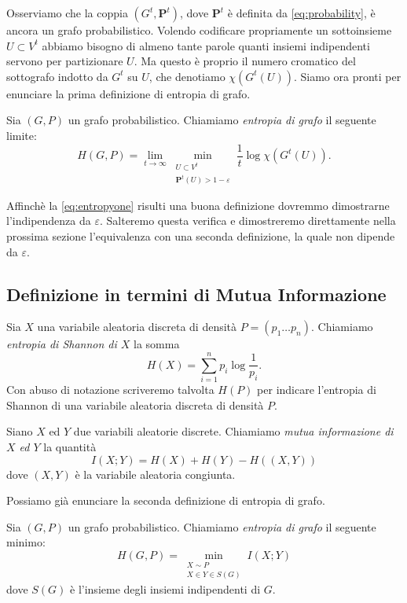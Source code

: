Osserviamo che la coppia \((G^t, \mathbf{P}^t)\), dove \(\mathbf{P}^t\) è definita da \eqref{eq:probability}, è ancora un grafo probabilistico. Volendo codificare propriamente un sottoinsieme \(U\subset V^{t}\) abbiamo bisogno di almeno tante parole quanti insiemi indipendenti servono per partizionare \(U\). Ma questo è proprio il numero cromatico del sottografo indotto da \(G^t\) su \(U\), che denotiamo \(\chi(G^t(U))\). Siamo ora pronti per enunciare la prima definizione di entropia di grafo. 
\begin{definition}
  Sia \((G,P)\) un grafo probabilistico. Chiamiamo \emph{entropia di grafo} il seguente limite: 
  \begin{equation}
    \label{eq:entropyone} H(G,P)=\lim_{t\to \infty} \min_{\substack{ U\subset V^t\\\mathbf{P}^t(U)>1-\varepsilon}} \frac{1}{t}\log{\chi(G^t(U))}. 
  \end{equation}
\end{definition}

Affinchè la \ref{eq:entropyone} risulti una buona definizione dovremmo dimostrarne l'indipendenza da \(\varepsilon\). Salteremo questa verifica e dimostreremo direttamente nella prossima sezione l'equivalenza con una seconda definizione, la quale non dipende da \(\varepsilon\).

\subsection{Definizione in termini di Mutua Informazione} 
\begin{definition}
  Sia \(X\) una variabile aleatoria discreta di densità \(P=(p_1\dots p_n)\). Chiamiamo \emph{entropia di Shannon di \(X\)} la somma
  \[H(X)=\sum_{i=1}^n p_i \log{\frac{1}{p_i}}.\]
  Con abuso di notazione scriveremo talvolta \(H(P)\) per indicare l'entropia di Shannon di una variabile aleatoria discreta di densit\`a \(P\). 
\end{definition}
\begin{definition}
  Siano \(X\) ed \(Y\) due variabili aleatorie discrete. Chiamiamo \emph{mutua informazione di \(X\) ed \(Y\)} la quantità
  \[I(X;Y)=H(X)+H(Y)-H((X,Y))\]
  dove \((X,Y)\) è la variabile aleatoria congiunta. 
\end{definition}

Possiamo già enunciare la seconda definizione di entropia di grafo. 
\begin{definition}
  Sia \((G,P)\) un grafo probabilistico. Chiamiamo \emph{entropia di grafo} il seguente minimo: 
  \begin{equation}
    \label{eq:entropytwo} H(G,P)=\min_{\substack{X\sim P \\ X\in Y\in S(G)}} I(X;Y) 
  \end{equation}
  dove \(S(G)\) \`e l'insieme degli insiemi indipendenti di \(G\).
\end{definition}

